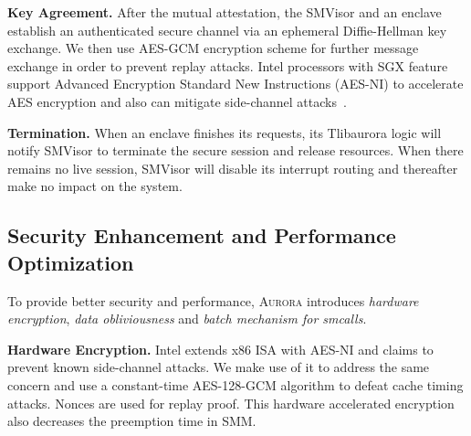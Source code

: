 \documentclass[journal,twocolumn,letterpaper,10pt]{IEEEtran}
\begin{document}
\textbf{Key Agreement.}
After the mutual attestation, the SMVisor and an enclave establish an authenticated secure channel via an ephemeral Diffie-Hellman key exchange. We then use AES-GCM encryption scheme for further message exchange in order to prevent replay attacks. Intel processors with SGX feature support Advanced Encryption Standard New Instructions (AES-NI) to accelerate AES encryption and also can mitigate side-channel attacks~\cite{Corporation2016Intel}.



\textbf{Termination.}
When an enclave finishes its requests, its Tlibaurora logic will notify SMVisor to terminate the secure session and release resources. When there remains no live session, SMVisor will disable its interrupt routing and thereafter make no impact on the system.

\subsection{Security Enhancement and Performance Optimization}\label{enhancement}
To provide better security and performance, \textsc{Aurora} introduces \textit{hardware encryption}, \textit{data obliviousness} and \textit{batch mechanism for smcalls}.

\textbf{Hardware Encryption.}
Intel extends x86 ISA with AES-NI and claims to prevent known side-channel attacks. We make use of it to address the same concern and use a constant-time AES-128-GCM algorithm to defeat cache timing attacks. Nonces are used for replay proof. This hardware accelerated encryption also decreases the preemption time in SMM.
\end{document}
